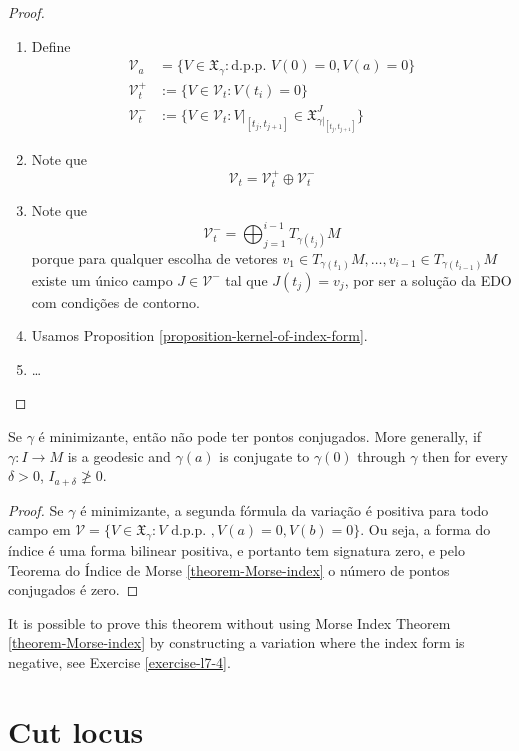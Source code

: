\documentclass{book}
\begin{document}
\begin{proof}
\begin{enumerate}
\item Define
$$
\begin{aligned}
\mathcal{V}_a&=\{V \in
\mathfrak{X}_\gamma:\text{d.p.p. }V(0)=0,
V(a)=0\}\\
\mathcal{V}_t^+&:=\{V \in
\mathcal{V}_t:V(t_i)=0\}\\
\mathcal{V}_t^-& :=\{V \in
\mathcal{V}_t:V|_{[t_j,t_{j+1}]}\in
\mathfrak{X}_{\gamma|_{[t_j,t_{j+1}]}}^J\}
\end{aligned}
$$
\item Note que
$$
\mathcal{V}_t=\mathcal{V}_t^+ \oplus
\mathcal{V}_t^-
$$
\item Note que
$$
\mathcal{V}_t^-=\bigoplus_{j=1}^{i-1}
T_{\gamma(t_j)}M
$$
porque para qualquer escolha de vetores
 $v_1 \in T_{\gamma(t_1)}M,\ldots,v_{i-1}\in
 T_{\gamma(t_{i-1})}M$ existe
 um único campo $J \in \mathcal{V}^-$ tal que
 $J(t_j)=v_j$, por ser a solução
 da EDO com condições de contorno.
\item Usamos Proposition
\ref{proposition-kernel-of-index-form}.
\item …
\end{enumerate}
\end{proof}



\begin{theorem}
\label{theorem-Jacobi-theorem}
Se $\gamma$ é minimizante, então não pode ter
pontos conjugados. More generally,
if $\gamma:I \to M$ is a geodesic and $
\gamma(a)$ is conjugate to $\gamma(0)$
through $\gamma$ then for every $\delta>0$,
$I_{a+\delta}\not \geq 0$.
\end{theorem}

\begin{proof}
Se $\gamma$ é minimizante, a segunda fórmula
da variação é positiva para todo
campo em $\mathcal{V}=\{V\in
\mathfrak{X}_\gamma:V \text{ d.p.p. },
V(a)=0,V(b)=0\}$. Ou seja, a forma do índice
é uma forma bilinear positiva, e
portanto tem signatura zero, e pelo Teorema
do Índice de Morse
\ref{theorem-Morse-index} o número de pontos
conjugados é zero.
\end{proof}

It is possible to prove this theorem without
using Morse Index Theorem
\ref{theorem-Morse-index} by constructing a
variation where the index form is
negative, see Exercise \ref{exercise-l7-4}.

\section{Cut locus}
\label{section-cut-locus}
\end{document}
